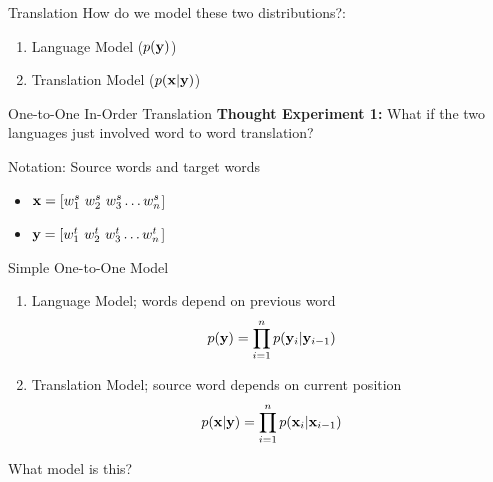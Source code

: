 \documentclass{beamer}
\begin{document}
\begin{frame}{Translation}
  How do we model these two distributions?:
  \air
  
  \begin{enumerate}
  \item Language Model ($p(\mathbf{y})$) 
    \air 

  \item Translation Model ($p(\mathbf{x} | \mathbf{y})$) 
  \end{enumerate}
\end{frame}


\begin{frame}{One-to-One In-Order Translation}
  \textbf{Thought Experiment 1:}
  What if the two languages just involved word to word 
  translation?

  \begin{center}
  \end{center}
  
  Notation: Source words and target words
  \begin{itemize}
  \item $\mathbf{x}  = [ w^s_1\ w^s_2\ w^s_3\ldots w^s_n $] 
  \item $\mathbf{y} =  [w^t_1\ w^t_2\ w^t_3\ldots w^t_n $] 
  \end{itemize}
\end{frame}


\begin{frame}{Simple One-to-One Model}
  \begin{enumerate}
  \item Language Model; words depend on previous word
    \[ p(\mathbf{y}) = \prod_{i=1}^n p(\mathbf{y}_i | \mathbf{y}_{i-1})  \] 
    \air 

  \item Translation Model; source word depends on current position
    \[ p(\mathbf{x} | \mathbf{y}) = \prod_{i=1}^n p(\mathbf{x}_i | \mathbf{x}_{i-1})  \] 
  \end{enumerate}

  What model is this?
\end{frame}
\end{document}
